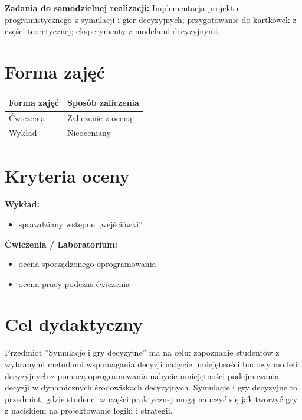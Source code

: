 \documentclass[12pt, a4paper]{article}
\newcommand{\thdrule}{\noalign{\global\setlength{\extrarowheight}{0pt}}}
\newcommand{\thdend}{\noalign{\global\setlength{\extrarowheight}{3pt}}}
\begin{document}
\vspace{4pt}
\noindent\textbf{Zadania do samodzielnej realizacji:} Implementacja projektu programistycznego z symulacji i gier decyzyjnych; przygotowanie do kartkówek z części teoretycznej; eksperymenty z modelami decyzyjnymi.

\section{Forma zajęć}

\begin{center}
{\scriptsize
\begin{tabular}{m{5cm}m{8cm}}
\thdrule\toprule
\rowcolor{pjatkRed} {\color{white}\textbf{Forma zajęć}} & {\color{white}\textbf{Sposób zaliczenia}} \\
\midrule\thdend
  \rowcolor{tableRowLight} Ćwiczenia & Zaliczenie z oceną \\
  \rowcolor{tableRowAlt} Wykład & Nieoceniany \\
\bottomrule
\end{tabular}}
\end{center}

\section{Kryteria oceny}

\textbf{Wykład:}
\begin{itemize}
  \item sprawdziany wstępne „wejściówki''
\end{itemize}
\vspace{4pt}
\textbf{Ćwiczenia / Laboratorium:}
\begin{itemize}
  \item ocena sporządzonego oprogramowania
  \item ocena pracy podczas ćwiczenia
\end{itemize}


\section{Cel dydaktyczny}

Przedmiot ''Symulacje i gry decyzyjne'' ma na celu: zapoznanie studentów z wybranymi metodami wspomagania decyzji nabycie umiejętności budowy modeli decyzyjnych z pomocą oprogramowania nabycie umiejętności podejmowania decyzji w dynamicznych środowiskach decyzyjnych. Symulacje i gry decyzyjne to przedmiot, gdzie studenci w części praktycznej mogą nauczyć się jak tworzyć gry z naciskiem na projektowanie logiki i strategii.
\end{document}
